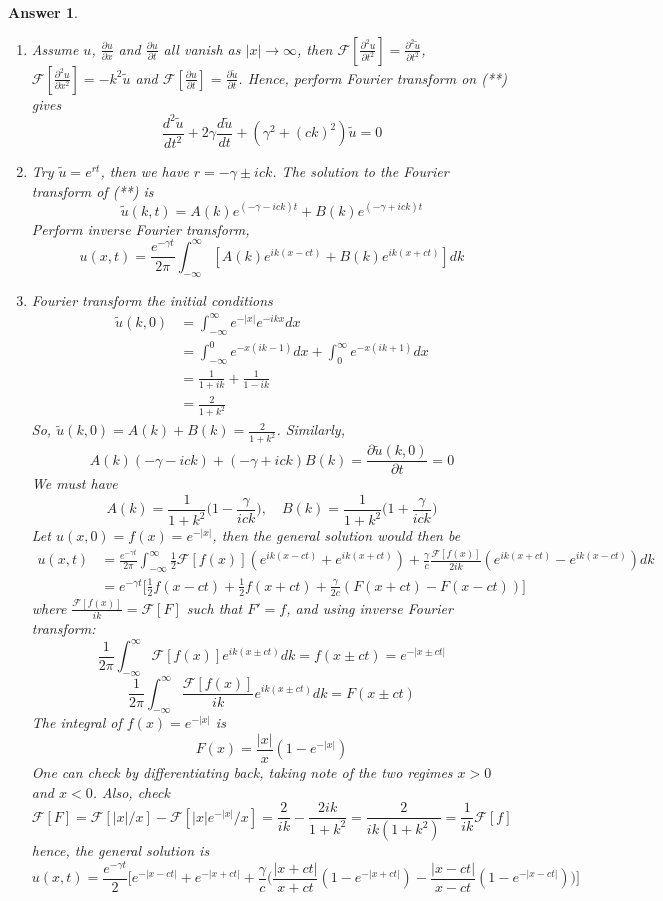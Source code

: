 \documentclass[a4paper]{article}
\newtheorem{ans}{Answer}[section]
\theoremstyle{new}
\begin{document}
\begin{ans}\leavevmode
\begin{enumerate}[label=(\roman*)]
\item Assume $u$, $\frac{\partial u}{\partial x}$ and $\frac{\partial u}{\partial t}$ all vanish as $|x|\rightarrow\infty$, then $\mathcal{F}[\frac{\partial^2u}{\partial t^2}]=\frac{\partial^2\tilde{u}}{\partial t^2}$, $\mathcal{F}[\frac{\partial^2u}{\partial x^2}]=-k^2\tilde{u}$ and $\mathcal{F}[\frac{\partial u}{\partial t}]=\frac{\partial\tilde{u}}{\partial t}$. Hence, perform Fourier transform on (**) gives
$$\frac{d^2\tilde{u}}{dt^2}+2\gamma\frac{d\tilde{u}}{dt}+(\gamma^2+(ck)^2)\tilde{u}=0$$
\item Try $\tilde{u}=e^{rt}$, then we have $r=-\gamma\pm ick$. The solution to the Fourier transform of (**) is
$$\tilde{u}(k,t)=A(k)e^{(-\gamma-ick)t}+B(k)e^{(-\gamma+ick)t}$$
Perform inverse Fourier transform,
$$u(x,t)=\frac{e^{-\gamma t}}{2\pi}\int_{-\infty}^\infty[A(k)e^{ik(x-ct)}+B(k)e^{ik(x+ct)}]dk$$
\item Fourier transform the initial conditions
\begin{align}
\tilde{u}(k,0)&=\int_{-\infty}^\infty e^{-|x|}e^{-ikx}dx\nonumber\\&=\int_{-\infty}^0e^{-x(ik-1)}dx+\int_0^\infty e^{-x(ik+1)}dx\nonumber\\&=\frac{1}{1+ik}+\frac{1}{1-ik}\nonumber\\&=\frac{2}{1+k^2}\nonumber
\end{align}
So, $\tilde{u}(k,0)=A(k)+B(k)=\frac{2}{1+k^2}$. Similarly, 
$$A(k)(-\gamma-ick)+(-\gamma+ick)B(k)=\frac{\partial\tilde{u}(k,0)}{\partial t}=0$$
We must have 
$$A(k)=\frac{1}{1+k^2}\bigg(1-\frac{\gamma}{ick}\bigg),\quad B(k)=\frac{1}{1+k^2}\bigg(1+\frac{\gamma}{ick}\bigg)$$
Let $u(x,0)=f(x)=e^{-|x|}$, then the general solution would then be
\begin{align}
u(x,t)&=\frac{e^{-\gamma t}}{2\pi}\int_{-\infty}^\infty\frac{1}{2}\mathcal{F}[f(x)](e^{ik(x-ct)}+e^{ik(x+ct)})+\frac{\gamma}{c}\frac{\mathcal{F}[f(x)]}{2ik}(e^{ik(x+ct)}-e^{ik(x-ct)})dk\nonumber\\&=e^{-\gamma t}\bigg[\frac{1}{2}f(x-ct)+\frac{1}{2}f(x+ct)+\frac{\gamma}{2c}(F(x+ct)-F(x-ct))\bigg]\nonumber
\end{align}
where $\frac{\mathcal{F}[f(x)]}{ik}=\mathcal{F}[F]$ such that $F'=f$, and using inverse Fourier transform:
$$\frac{1}{2\pi}\int_{-\infty}^\infty\mathcal{F}[f(x)]e^{ik(x\pm ct)}dk=f(x\pm ct)=e^{-|x\pm ct|}$$
$$\frac{1}{2\pi}\int_{-\infty}^\infty\frac{\mathcal{F}[f(x)]}{ik}e^{ik(x\pm ct)}dk=F(x\pm ct)$$
The integral of $f(x)=e^{-|x|}$ is
$$F(x)=\frac{|x|}{x}(1-e^{-|x|})$$
One can check by differentiating back, taking note of the two regimes $x>0$ and $x<0$. Also, check 
$$\mathcal{F}[F]=\mathcal{F}[|x|/x]-\mathcal{F}[|x|e^{-|x|}/x]=\frac{2}{ik}-\frac{2ik}{1+k^2}=\frac{2}{ik(1+k^2)}=\frac{1}{ik}\mathcal{F}[f]$$
hence, the general solution is
$$u(x,t)=\frac{e^{-\gamma t}}{2}\bigg[e^{-|x-ct|}+e^{-|x+ct|}+\frac{\gamma}{c}\bigg(\frac{|x+ct|}{x+ct}(1-e^{-|x+ct|})-\frac{|x-ct|}{x-ct}(1-e^{-|x-ct|})\bigg)\bigg]$$
\end{enumerate}
\end{ans}
\end{document}
